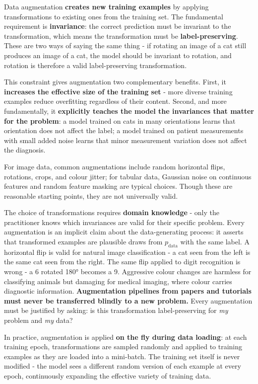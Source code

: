 Data augmentation \textbf{creates new training examples} by applying transformations to existing ones from the training set. The fundamental requirement is \textbf{invariance}: the correct prediction must be invariant to the transformation, which means the transformation must be \textbf{label-preserving}. These are two ways of saying the same thing - if rotating an image of a cat still produces an image of a cat, the model should be invariant to rotation, and rotation is therefore a valid label-preserving transformation.

This constraint gives augmentation two complementary benefits. First, it \textbf{increases the effective size of the training set} - more diverse training examples reduce overfitting regardless of their content. Second, and more fundamentally, it \textbf{explicitly teaches the model the invariances that matter for the problem}: a model trained on cats in many orientations learns that orientation does not affect the label; a model trained on patient measurements with small added noise learns that minor measurement variation does not affect the diagnosis.

For image data, common augmentations include random horizontal flips, rotations, crops, and colour jitter; for tabular data, Gaussian noise on continuous features and random feature masking are typical choices. Though these are reasonable starting points, they are not universally valid.  

The choice of transformations requires \textbf{domain knowledge} - only the practitioner knows which invariances are valid for their specific problem. Every augmentation is an implicit claim about the data-generating process: it asserts that transformed examples are plausible draws from $p_{\text{data}}$ with the same label. A horizontal flip is valid for natural image classification - a cat seen from the left is the same cat seen from the right. The same flip applied to digit recognition is wrong - a 6 rotated 180° becomes a 9. Aggressive colour changes are harmless for classifying animals but damaging for medical imaging, where colour carries diagnostic information. 
\textbf{Augmentation pipelines from papers and tutorials must never be transferred blindly to a new problem.} 
Every augmentation must be justified by asking: is this transformation label-preserving for \emph{my} problem and \emph{my} data?


In practice, augmentation is applied \textbf{on the fly during data loading}: at each training epoch, transformations are sampled randomly and applied to training examples as they are loaded into a mini-batch. The training set itself is never modified - the model sees a different random version of each example at every epoch, continuously expanding the effective variety of training data.

